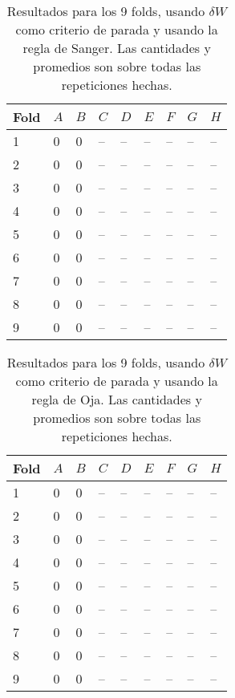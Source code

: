 \documentclass[informe.tex]{subfiles}
\begin{document}
      
      \begin{table}[h]
	\centering
	\begin{tabular}{|l|l|l|l|l|l|l|l|l|} \hline
	Fold & $A$ & $B$ & $C$ & $D$ & $E$ & $F$ & $G$ & $H$ \\ \hline
	1& 0 & 0 & -- & -- & -- & -- & -- & -- \\ \hline
	2& 0 & 0 & -- & -- & -- & -- & -- & -- \\ \hline
	3& 0 & 0 & -- & -- & -- & -- & -- & -- \\ \hline
	4& 0 & 0 & -- & -- & -- & -- & -- & -- \\ \hline
	5& 0 & 0 & -- & -- & -- & -- & -- & -- \\ \hline
	6& 0 & 0 & -- & -- & -- & -- & -- & -- \\ \hline
	7& 0 & 0 & -- & -- & -- & -- & -- & -- \\ \hline
	8& 0 & 0 & -- & -- & -- & -- & -- & -- \\ \hline
	9& 0 & 0 & -- & -- & -- & -- & -- & -- \\ \hline
	\end{tabular}
	\caption{Resultados para los 9 folds, usando $\delta W$ como criterio de parada y usando la regla de Sanger. Las cantidades y promedios son sobre todas las repeticiones hechas.}
	\label{tab:pesos_sanger}
      \end{table}      
      

      \begin{table}[h]
	\centering
	\begin{tabular}{|l|l|l|l|l|l|l|l|l|} \hline
	Fold & $A$ & $B$ & $C$ & $D$ & $E$ & $F$ & $G$ & $H$ \\ \hline
	1& 0 & 0 & -- & -- & -- & -- & -- & -- \\ \hline
	2& 0 & 0 & -- & -- & -- & -- & -- & -- \\ \hline
	3& 0 & 0 & -- & -- & -- & -- & -- & -- \\ \hline
	4& 0 & 0 & -- & -- & -- & -- & -- & -- \\ \hline
	5& 0 & 0 & -- & -- & -- & -- & -- & -- \\ \hline
	6& 0 & 0 & -- & -- & -- & -- & -- & -- \\ \hline
	7& 0 & 0 & -- & -- & -- & -- & -- & -- \\ \hline
	8& 0 & 0 & -- & -- & -- & -- & -- & -- \\ \hline
	9& 0 & 0 & -- & -- & -- & -- & -- & -- \\ \hline
	\end{tabular}
	\caption{Resultados para los 9 folds, usando $\delta W$ como criterio de parada y usando la regla de Oja. Las cantidades y promedios son sobre todas las repeticiones hechas.}
	\label{tab:pesos_oja}
      \end{table}            
      
\end{document}
